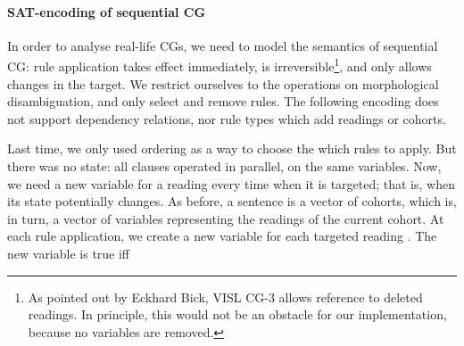 \paragraph{SAT-encoding of sequential CG}
\label{sec:orderedScheme}

In order to analyse real-life CGs, we need to model the semantics of sequential CG: 
rule application takes effect immediately, is irreversible\footnote{As pointed out by Eckhard Bick, VISL CG-3 allows reference to deleted readings. In principle, this would not be an obstacle for our implementation, because no variables are removed.}, and only allows changes in the target.
We restrict ourselves to the operations on morphological disambiguation, and only {\sc select} and {\sc remove} rules. 
The following encoding does not support dependency relations, nor rule types which add readings or cohorts. 

%
%
%
%
%
Last time, we only used ordering as a way to choose the which rules to apply.
But there was no state: all clauses operated in parallel, on the same variables. 
Now, we need a new variable for a reading every time when it is targeted; 
that is, when its state potentially changes.
As before, a sentence is a vector of cohorts, which is, in turn, a vector of variables representing the readings of the current cohort.
At each rule application, we create a new variable \newVar{} for each targeted reading \oldVar{}.
The new variable \newVar{} is true iff 

